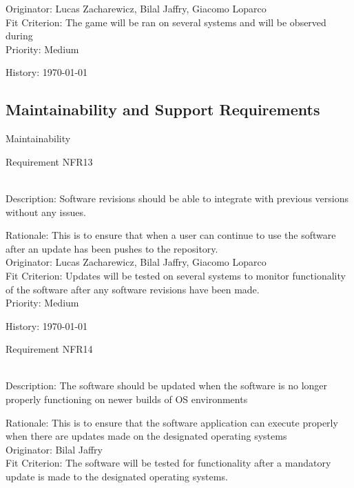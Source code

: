 \documentclass[12pt, titlepage]{article}
\begin{document}
\begin{enumerate}
{\color{blue}Originator:  Lucas Zacharewicz, Bilal Jaffry, Giacomo Loparco}\\

{\color{blue}Fit Criterion: The game will be ran on several systems and will be observed during }\\
 
{\color{blue}Priority: Medium}
  
{\color{blue}History: \today}

\newpage
\subsection{Maintainability and Support Requirements}
Maintainability
{\color{blue}\item Requirement NFR13}\\
{\color{blue}Description: } Software revisions should be able to integrate with previous versions without any issues.

{\color{blue}Rationale: This is to ensure that when a user can continue to use the software after an update has been pushes to the repository.}\\

{\color{blue}Originator:  Lucas Zacharewicz, Bilal Jaffry, Giacomo Loparco}\\

{\color{blue}Fit Criterion: Updates will be tested on several systems to monitor functionality of the software after any software revisions have been made. }\\
 
{\color{blue}Priority: Medium}
  
{\color{blue}History: \today}

{\color{blue}\item Requirement NFR14} \\
{\color{blue}Description:} The software should be updated when the software is no longer properly functioning on newer builds of OS environments

{\color{blue}Rationale: This is to ensure that the software application can execute properly when there are updates made on the designated operating systems }\\

{\color{blue}Originator: Bilal Jaffry}\\

{\color{blue}Fit Criterion: The software will be tested for functionality after a mandatory update is made to the designated operating systems. }\\
 

\end{enumerate}
\end{document}
